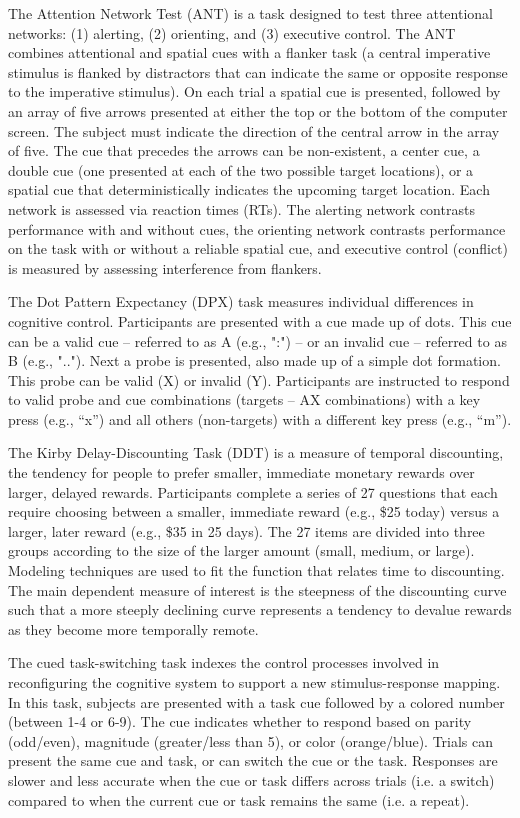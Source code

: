 \documentclass[titlepage,12pt] {article}
\begin{document}
The Attention Network Test (ANT) is a task designed to test three attentional networks: (1) alerting, (2) orienting, and (3) executive control. The ANT combines attentional and spatial cues with a flanker task (a central imperative stimulus is flanked by distractors that can indicate the same or opposite response to the imperative stimulus). On each trial a spatial cue is presented, followed by an array of five arrows presented at either the top or the bottom of the computer screen. The subject must indicate the direction of the central arrow in the array of five. The cue that precedes the arrows can be non-existent, a center cue, a double cue (one presented at each of the two possible target locations), or a spatial cue that deterministically indicates the upcoming target location. Each network is assessed via reaction times (RTs). The alerting network contrasts performance with and without cues, the orienting network contrasts performance on the task with or without a reliable spatial cue, and executive control (conflict) is measured by assessing interference from flankers.

The Dot Pattern Expectancy (DPX) task measures individual differences in cognitive control. Participants are presented with a cue made up of dots. This cue can be a valid cue – referred to as A (e.g., ":") – or an invalid cue – referred to as B (e.g., ".."). Next a probe is presented, also made up of a simple dot formation. This probe can be valid (X) or invalid (Y). Participants are instructed to respond to valid probe and cue combinations (targets – AX combinations) with a key press (e.g., “x”) and all others (non-targets) with a different key press (e.g., “m”).

The Kirby Delay-Discounting Task (DDT) is a measure of temporal discounting, the tendency for people to prefer smaller, immediate monetary rewards over larger, delayed rewards. Participants complete a series of 27 questions that each require choosing between a smaller, immediate reward (e.g., \$25 today) versus a larger, later reward (e.g., \$35 in 25 days). The 27 items are divided into three groups according to the size of the larger amount (small, medium, or large). Modeling techniques are used to fit the function that relates time to discounting. The main dependent measure of interest is the steepness of the discounting curve such that a more steeply declining curve represents a tendency to devalue rewards as they become more temporally remote.

The cued task-switching task indexes the control processes involved in reconfiguring the cognitive system to support a new stimulus-response mapping. In this task, subjects are presented with a task cue followed by a colored number (between 1-4 or 6-9). The cue indicates whether to respond based on parity (odd/even), magnitude (greater/less than 5), or color (orange/blue). Trials can present the same cue and task, or can switch the cue or the task. Responses are slower and less accurate when the cue or task differs across trials (i.e. a switch) compared to when the current cue or task remains the same (i.e. a repeat).
\end{document}
